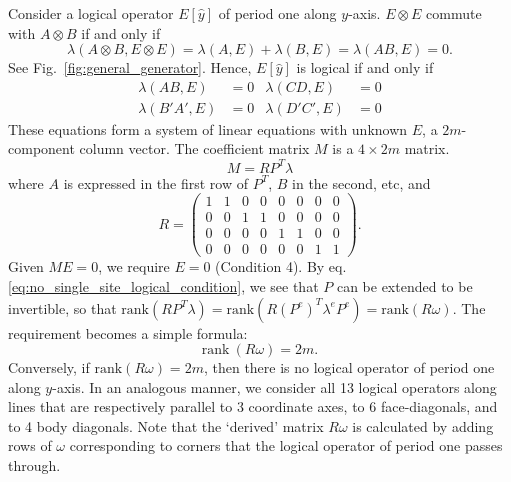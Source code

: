 \documentclass[letterpaper,10pt,pra,aps,showpacs,twocolumn]{revtex4-1}
\theoremstyle{definition} \newtheorem{defn}{Definition}
\theoremstyle{definition} \newtheorem{remark}{Remark}
\newcommand{\rank}{\mathrm{rank}}
\begin{document}
Consider a logical operator $E[\hat{y}]$ of period one along $y$-axis. $E \otimes E$ commute with $A \otimes B$ if and only if 
\[
 \lambda(A \otimes B, E \otimes E) = \lambda(A,E) + \lambda(B,E) = \lambda(AB,E) = 0.
\]
See Fig.~\ref{fig:general_generator}. Hence, $E[\hat{y}]$ is logical if and only if
\begin{align*}
\lambda(AB, E)   &=0   & \lambda(CD, E)   &=0 \\
\lambda(B'A', E) &=0   & \lambda(D'C', E) &=0
\end{align*}
These equations form a system of linear equations with unknown $E$, a $2m$-component column vector. The coefficient matrix $M$ is a $4 \times 2m$ matrix.
\[
M = R P^T \lambda
\]
where $A$ is expressed in the first row of $P^T$, $B$ in the second, etc, and
\begin{equation}
R = 
\begin{pmatrix}
1&1 & 0&0 & 0&0 & 0&0 \\
0&0 & 1&1 & 0&0 & 0&0 \\
0&0 & 0&0 & 1&1 & 0&0 \\
0&0 & 0&0 & 0&0 & 1&1 
\end{pmatrix}.
\label{eq:deriving_matrix}
\end{equation}
Given $M E = 0$, we require $E=0$ (Condition 4). By eq.\eqref{eq:no_single_site_logical_condition}, we see that $P$ can be extended to be invertible, so that $\rank( R P^T \lambda ) = \rank (R (P^e)^T \lambda^e P^e ) = \rank ( R \omega )$. The requirement becomes a simple formula:
\begin{equation}
\rank \ ( R \omega ) = 2m .
\end{equation}
Conversely, if $\rank(R \omega)=2m$, then there is no logical operator of period one along $y$-axis. In an analogous manner, we consider all 13 logical operators along lines that are respectively parallel to 3 coordinate axes, to 6 face-diagonals, and to 4 body diagonals. Note that the `derived' matrix $R \omega$ is calculated by adding rows of $\omega$ corresponding to corners that the logical operator of period one passes through.
\end{document}

